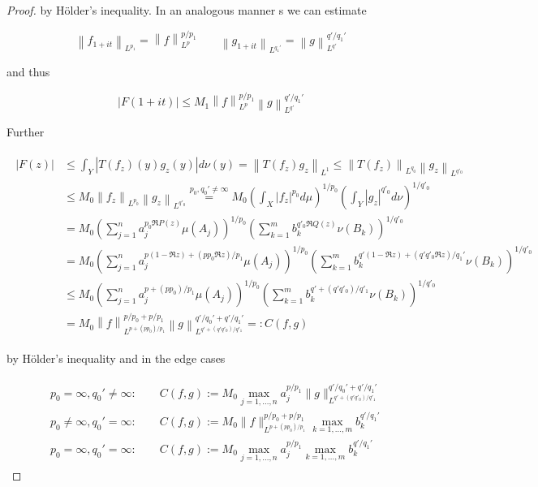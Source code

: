 \begin{proof}
by H\"older's inequality. In an analogous manner s we can estimate 
				
\begin{equation*}
	\left\|f_{1 + it}\right\|_{L^{p_1}} = \left\|f\right\|_{L^p}^{p/p_1} \qquad \left\|g_{1 + it}\right\|_{L^{q_1'}} = \left\|g\right\|_{L^{q'}}^{q'/q_1'}
\end{equation*}

and thus 
				
\begin{equation*}
	\left| F(1 + it)\right| \leqslant M_1 \left\|f\right\|_{L^p}^{p/p_1}\left\|g\right\|_{L^{q'}}^{q'/q_1'}
\end{equation*}	

Further 
		
\begin{gather*}
	\begin{aligned}
		\left| F(z)\right| &\leqslant \int_Y\left| T(f_z)(y)g_z(y)\right| d\nu(y) = \left\|T(f_z)g_z\right\|_{L^1} \leqslant \left\|T(f_z)\right\|_{L^{q_0}} \left\|g_z\right\|_{L^{q'_0}}\\
				&\leqslant M_0 \left\|f_z\right\|_{L^{p_0}} \left\|g_z\right\|_{L^{q'_0}} \overset{p_0,q_0' \neq \infty}{=} M_0 \left(\int_X \left| f_z \right|^{p_0}d\mu \right)^{1/p_0} \left(\int_Y \left| g_z \right|^{q'_0} d\nu\right)^{1/q'_0}\\
				&= M_0 \left( \sum\limits_{j = 1}^n a_j^{p_0\Re P(z)}\mu(A_j) \right)^{1/p_0} \left( \sum\limits_{k = 1}^m b_k^{q'_0\Re Q(z)} \nu(B_k) \right)^{1/q'_0}\\
				&= M_0 \left( \sum\limits_{j = 1}^n a_j^{p\left(1 - \Re z\right) + \left(pp_0\Re z\right)/p_1}\mu(A_j) \right)^{1/p_0} \left( \sum\limits_{k = 1}^m b_k^{q'\left(1 - \Re z\right) + \left(q'q'_0\Re z\right)/q_1'} \nu(B_k) \right)^{1/q'_0}\\
				&\leqslant M_0 \left( \sum\limits_{j = 1}^n a_j^{p + \left(pp_0\right)/p_1}\mu(A_j) \right)^{1/p_0} \left( \sum\limits_{k = 1}^m b_k^{q' + \left(q'q'_0\right)/q'_1} \nu(B_k) \right)^{1/q'_0}\\
				&= M_0 \left\|f\right\|_{L^{p + \left(pp_0\right)/p_1}}^{p/p_0 + p/p_1} \left\|g\right\|_{L^{q' + \left(q'q'_0\right)/q'_1}}^{q'/q_0' + q'/q_1'} =: C(f,g)
			\end{aligned}
		\end{gather*}
		
		
by H\"older's inequality and in the edge cases
		
\begin{gather*}
	\begin{aligned}
		&p_0 = \infty, q_0' \neq \infty: \qquad C(f,g) := M_0 \max_{j = 1,\hdots,n} a_j^{p/p_1} \|g\|_{L^{q' + (q'q'_0)/q'_1}}^{q'/q_0' + q'/q_1'}\\
		&p_0 \neq \infty, q_0' = \infty: \qquad C(f,g) :=  M_0 \|f\|_{L^{p + (pp_0)/p_1}}^{p/p_0 + p/p_1} \max_{k = 1,\hdots,m} b_k^{q'/q_1'}\\
		&p_0 = \infty, q_0' = \infty: \qquad C(f,g) := M_0 \max_{j = 1,\hdots,n} a_j^{p/p_1} \max_{k = 1,\hdots,m} b_k^{q'/q_1'}
	\end{aligned}
\end{gather*}
		

\end{proof}
